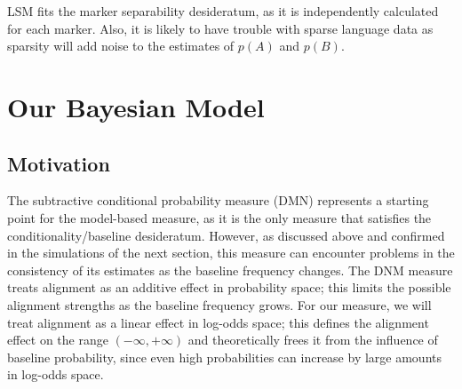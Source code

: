 \documentclass{acm_proc_article-sp}
\begin{document}
LSM fits the marker separability desideratum, as it is independently calculated for each marker. Also, it is likely to have trouble with sparse language data as sparsity will add noise to the estimates of $p(A)$ and $p(B)$.





\section{Our Bayesian Model}

\subsection{Motivation}
The subtractive conditional probability measure (DMN) represents a starting point for the model-based measure, as it is the only measure that satisfies the conditionality/baseline desideratum. However, as discussed above and confirmed in the simulations of the next section, this measure can encounter problems in the consistency of its estimates as the baseline frequency changes.  The DNM measure treats alignment as an additive effect in probability space; this limits the possible alignment strengths as the baseline frequency grows.  For our measure, we will treat alignment as a linear effect in log-odds space; this defines the alignment effect on the range $(-\infty,+\infty)$ and theoretically frees it from the influence of baseline probability, since even high probabilities can increase by large amounts in log-odds space.
\end{document}
